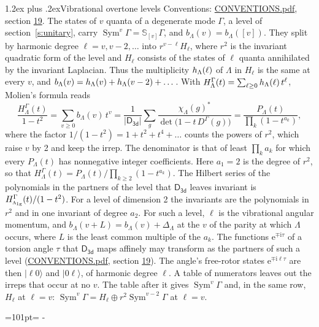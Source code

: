 \documentclass[10pt,a4paper]{article}
\makeatletter
\renewcommand\section{\@startsection{section}{1}{\z@}{-3ex plus -1ex minus -.2ex}%
  {1.2ex plus .2ex}{\normalfont\large\sffamily\bfseries\color{parttitle}}}
\newcommand{\needspace}[1]{\par\penalty-100\begingroup\dimen0=#1\relax\dimen2=\pagegoal
  \advance\dimen2-\pagetotal\ifdim\dimen0>\dimen2\relax\ifdim\dimen2>0pt\vfil\break\fi\fi
  \endgroup}
\numberwithin{equation}{section}
\newcommand{\grp}[1]{\mathsf{#1}}
\newcommand{\irr}[1]{\text{\normalfont\scshape #1}}
\newcommand{\ptag}[1]{\mathrm{#1}}
\newcommand{\iunit}{\mathrm{i}}
\newcommand{\expe}{\mathrm{e}}
\newcommand{\repD}[1]{D^{#1}}
\newcommand{\irchar}[1]{\chi_{#1}}
\newcommand{\conj}[1]{{#1}^{*}}
\newcommand{\schur}[1]{\mathbb{S}_{#1}}
\newcommand{\shape}[1]{[#1]}
\newcommand{\occ}[1]{\lvert #1\rangle}
\makeatother
\begin{document}
\section{Vibrational overtone levels}\label{s:overtones}
Conventions: \href{../../CONVENTIONS.pdf}{CONVENTIONS.pdf}, section \href{../../CONVENTIONS.pdf\#conv.19}{19}.
\leavevmode\label{n:index.quanta}\label{n:operator.symmetric.power}The states of $v$ quanta of a degenerate mode $\Gamma$, a level of section~\ref{s:unitary}, carry $\operatorname{Sym}^{v}\Gamma = \schur{\shape{v}}\Gamma$, and $b_\Lambda(v) = b_\Lambda(\shape{v})$. \label{n:local.quadratic.form}\label{n:set.harmonic}They split by harmonic degree $\ell = v, v - 2, \dots$ into $r^{v-\ell}H_\ell$, where $r^2$ is the invariant quadratic form of the level and $H_\ell$ consists of the states of $\ell$ quanta annihilated by the invariant Laplacian. \label{n:function.multiplicity.harmonic}Thus the multiplicity $\mathnormal{h}_\Lambda(\ell)$ of $\Lambda$ in $H_\ell$ is the same at every $v$, and $b_\Lambda(v) = \mathnormal{h}_\Lambda(v) + \mathnormal{h}_\Lambda(v - 2) + \dots$. \label{n:function.generating.level}With $H^{\Gamma}_\Lambda(t) = \sum_{\ell\ge0} \mathnormal{h}_\Lambda(\ell)\,t^{\ell}$, Molien's formula reads
\begin{equation}\label{e:molien}\frac{H^{\Gamma}_\Lambda(t)}{1 - t^2} = \sum_{v\ge0} b_\Lambda(v)\,t^v = \frac{1}{|\grp{D_{3d}}|}\sum_{g}\frac{\conj{\irchar{\Lambda}(g)}}{\det\bigl(1 - t\,\repD{\Gamma}(g)\bigr)} = \frac{P_\Lambda(t)}{\prod_k (1-t^{a_k})},\end{equation}
where the factor $1/(1 - t^2) = 1 + t^2 + t^4 + \dots$ counts the powers of $r^2$, which raise $v$ by 2 and keep the irrep. The denominator is that of least $\prod_k a_k$ for which every $P_\Lambda(t)$ has nonnegative integer coefficients. Here $a_1 = 2$ is the degree of $r^2$, so that $H^{\Gamma}_\Lambda(t) = P_\Lambda(t)/\prod_{k\ge2}(1 - t^{a_k})$. The Hilbert series of the polynomials in the partners of the level that $\grp{D_{3d}}$ leaves invariant is $H^{\Gamma}_{\irr{a}_{1\ptag{g}}}(t)/(1 - t^2)$. For a level of dimension 2 the invariants are the polynomials in $r^2$ and in one invariant of degree $a_2$. \label{n:index.overtone.period}\label{n:index.increment.unitary}For such a level, $\ell$ is the vibrational angular momentum, and $b_\Lambda(v + L) = b_\Lambda(v) + \Delta_\Lambda$ at the $v$ of the parity at which $\Lambda$ occurs, where $L$ is the least common multiple of the $a_k$. \label{n:local.torsion.angle}The functions $\expe^{\mp\iunit\tau}$ of a torsion angle $\tau$ that $\grp{D_{3d}}$ maps affinely may transform as the partners of such a level (\href{../../CONVENTIONS.pdf}{CONVENTIONS.pdf}, section \href{../../CONVENTIONS.pdf\#conv.19}{19}). The angle's free-rotor states $\expe^{\mp\iunit\ell\tau}$ are then $\occ{\ell 0}$ and $\occ{0 \ell}$, of harmonic degree $\ell$. A table of numerators leaves out the irreps that occur at no $v$. The table after it gives $\operatorname{Sym}^{v}\Gamma$ and, in the same row, $H_\ell$ at $\ell = v$: $\operatorname{Sym}^{v}\Gamma = H_\ell \oplus r^2\operatorname{Sym}^{v-2}\Gamma$ at $\ell = v$.
\needspace{101pt}
\end{document}
